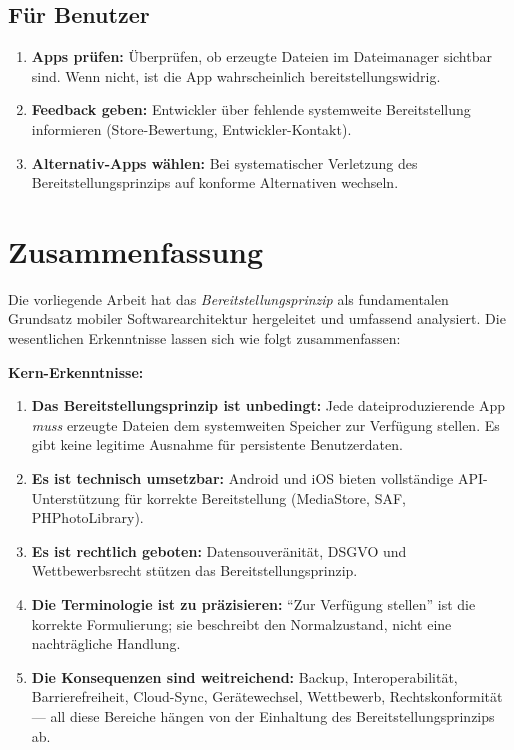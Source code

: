 ﻿\documentclass[12pt, a4paper]{article}
\begin{document}
\subsection{Für Benutzer}

\begin{enumerate}[label=\textbf{B\arabic*.}]
  \item \textbf{Apps prüfen:} Überprüfen, ob erzeugte Dateien im Dateimanager
    sichtbar sind. Wenn nicht, ist die App wahrscheinlich bereitstellungswidrig.
  \item \textbf{Feedback geben:} Entwickler über fehlende systemweite
    Bereitstellung informieren (Store-Bewertung, Entwickler-Kontakt).
  \item \textbf{Alternativ-Apps wählen:} Bei systematischer Verletzung des
    Bereitstellungsprinzips auf konforme Alternativen wechseln.
\end{enumerate}

\section{Zusammenfassung}
\label{sec:zusammenfassung}

Die vorliegende Arbeit hat das \emph{Bereitstellungsprinzip} als fundamentalen
Grundsatz mobiler Softwarearchitektur hergeleitet und umfassend analysiert.
Die wesentlichen Erkenntnisse lassen sich wie folgt zusammenfassen:

\noindent\textbf{Kern-Erkenntnisse:}
\begin{enumerate}[leftmargin=*, label=\textbf{\arabic*.}]
  \item \textbf{Das Bereitstellungsprinzip ist unbedingt:} Jede dateiproduzierende
    App \emph{muss} erzeugte Dateien dem systemweiten Speicher zur Verfügung stellen.
    Es gibt keine legitime Ausnahme für persistente Benutzerdaten.
  \item \textbf{Es ist technisch umsetzbar:} Android und iOS bieten vollständige
    API-Unterstützung für korrekte Bereitstellung (MediaStore, SAF, PHPhotoLibrary).
  \item \textbf{Es ist rechtlich geboten:} Datensouveränität, DSGVO und
    Wettbewerbsrecht stützen das Bereitstellungsprinzip.
  \item \textbf{Die Terminologie ist zu präzisieren:} \enquote{Zur Verfügung stellen}
    ist die korrekte Formulierung; sie beschreibt den Normalzustand, nicht
    eine nachträgliche Handlung.
  \item \textbf{Die Konsequenzen sind weitreichend:} Backup, Interoperabilität,
    Barrierefreiheit, Cloud-Sync, Gerätewechsel, Wettbewerb, Rechtskonformität
    --- all diese Bereiche hängen von der Einhaltung des Bereitstellungsprinzips ab.
\end{enumerate}
\end{document}

